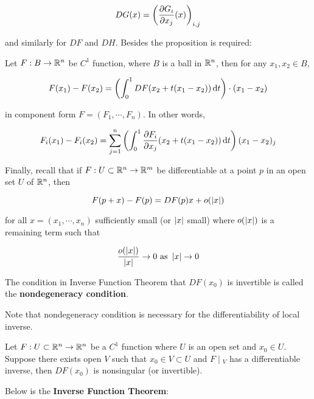\documentclass[a4paper,12pt]{article}
\begin{document}
$$DG(x)=\left( \frac{\partial G_{i}}{\partial x_{j}}(x)\right)_{i,j}$$\s

and similarly for $DF$ and $DH$. Besides the proposition is required:\n

\begin{pst}
  Let $F:B\to\mathbb{R}^{n}$ be $C^{1}$ function, where $B$ is a ball in $\mathbb{R}^{n}$, then for any $x_{1},x_{2}\in B$,

  $$F(x_{1})-F(x_{2})=\left( \int_{0}^{1}DF(x_{2}+t(x_{1}-x_{2}))\,\mathrm{d} t\right)\cdot(x_{1}-x_{2})$$\s

  in component form $F=(F_{1},\cdots,F_{n})$. In other words,

  $$F_{i}(x_{1})-F_{i}(x_{2})=\sum_{j=1}^{n}\left( \int_{0}^{1}\frac{\partial F_{i}}{\partial x_{j}}(x_{2}+t(x_{1}-x_{2}))\,\mathrm{d} t\right)(x_{1}-x_{2})_{j}$$
\end{pst}\n

Finally, recall that if $F:U\subset\mathbb{R}^{n}\to\mathbb{R}^{m}$ be differentiable at a point $p$ in an open set $U$ of $\mathbb{R}^{n}$, then

$$F(p+x)-F(p)=DF(p)x+o(\left| x\right|)$$\s

for all $x=(x_{1},\cdots,x_{n})$ sufficiently small (or $\left| x\right|$ small) where $o(\left| x\right|)$ is a remaining term such that

$$\frac{o(\left| x\right|)}{\left| x\right|}\to 0\text{ as }\left| x\right|\to 0$$\s

\begin{dft}
  The condition in Inverse Function Theorem that $DF(x_{0})$ is invertible is called the \textbf{nondegeneracy condition}.
\end{dft}\n

Note that nondegeneracy condition is necessary for the differentiability of local inverse.\n

\begin{pst}
  Let $F:U\subset\mathbb{R}^{n}\to\mathbb{R}^{n}$ be a $C^{1}$ function where $U$ is an open set and $x_{0}\in U$. Suppose there exists open $V$ such that $x_{0}\in V\subset U$ and $F\!\mid\!_{V}$ has a differentiable inverse, then $DF(x_{0})$ is nonsingular (or invertible).
\end{pst}\n

Below is the \textbf{Inverse Function Theorem}:\n
\end{document}
